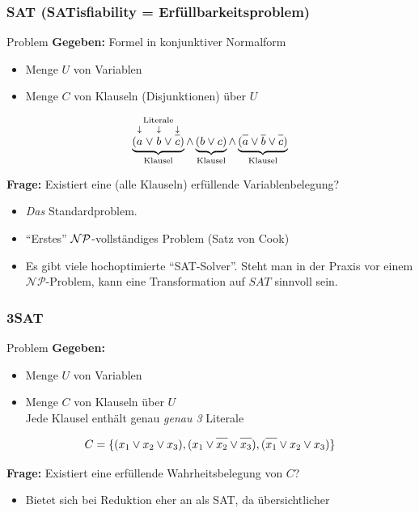 \begin{frame}
\frametitle{SAT (SATisfiability = Erfüllbarkeitsproblem)}
\begin{block}{Problem}
\textbf{Gegeben:} Formel in konjunktiver Normalform
\begin{itemize}
 \item Menge $U$ von Variablen
 \item Menge $C$ von Klauseln (Disjunktionen) über $U$
\end{itemize} $$ \underbrace{(\stackrel{\text{Literale}}{\stackrel{\downarrow}{\vphantom{\neglit{a}}a} \vee \stackrel{\downarrow}{\vphantom{\neglit{b}}b} \vee \stackrel{\downarrow}{\neglit{c}}})}_\text{Klausel} \wedge \underbrace{(b \vee c)}_\text{Klausel} \wedge \underbrace{(\neglit{a} \vee \neglit{b} \vee \neglit{c})}_\text{Klausel}$$

\textbf{Frage:} Existiert eine (alle Klauseln) erfüllende Variablenbelegung?
\end{block}
\pause \begin{itemize}
\item \emph{Das} Standardproblem.
\item "`Erstes"' $\mathcal{NP}{}$-vollständiges Problem (Satz von Cook)
\item Es gibt viele hochoptimierte "`SAT-Solver"'. Steht man in der Praxis vor einem $\mathcal{NP}$-Problem, kann eine Transformation auf $SAT$ sinnvoll sein.
\end{itemize}
\end{frame}
\begin{frame}
\frametitle{3SAT}
\begin{block}{Problem}
\textbf{Gegeben:}
\begin{itemize}
 \item Menge $U$ von Variablen
 \item Menge $C$ von Klauseln über $U$ \\ Jede Klausel enthält genau \emph{genau 3} Literale
\end{itemize} $$C = \{ (x_1 \vee x_2 \vee x_3), (x_1 \vee \neglit{x_2} \vee \neglit{x_3}), (\neglit{x_1} \vee x_2 \vee x_3) \}$$

\textbf{Frage:} Existiert eine erfüllende Wahrheitsbelegung von $C$?
\end{block}
\begin{itemize}
\item Bietet sich bei Reduktion eher an als SAT, da übersichtlicher
\end{itemize}
\end{frame}
